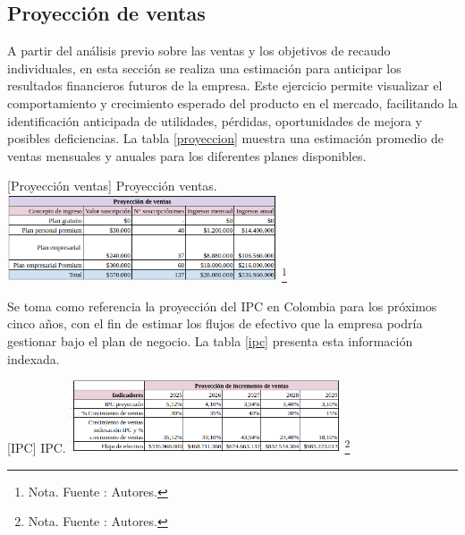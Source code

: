 \subsection{Proyección de ventas}

A partir del análisis previo sobre las ventas y los objetivos de recaudo individuales, en esta sección se realiza una estimación para anticipar los resultados financieros futuros de la empresa. Este ejercicio permite visualizar el comportamiento y crecimiento esperado del producto en el mercado, facilitando la identificación anticipada de utilidades, pérdidas, oportunidades de mejora y posibles deficiencias. La tabla \ref{proyeccion} muestra una estimación promedio de ventas mensuales y anuales para los diferentes planes disponibles.

\vspace{2mm}
\begin{minipage}{0.9\textwidth}
\centering
{}[{Proyección ventas}]{ Proyección ventas. }
\label{proyeccion}
\includegraphics[width=0.6\textwidth]{Content/Images/AF/Proyeccion_de_ventas.png}
\footnote{Nota. \textup{Fuente : Autores.}}
\end{minipage}

Se toma como referencia la proyección del IPC en Colombia para los próximos cinco años, con el fin de estimar los flujos de efectivo que la empresa podría gestionar bajo el plan de negocio. La tabla \ref{ipc} presenta esta información indexada.

\vspace{2mm}
\begin{minipage}{0.9\textwidth}
\centering
{}[{IPC}]{ IPC. }
\label{ipc}
\includegraphics[width=0.6\textwidth]{Content/Images/AF/Proyeccion_de_incremento_ventas.png}
\footnote{Nota. \textup{Fuente : Autores.}}
\end{minipage}
